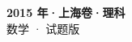 \documentclass[zihao=-4, a4paper]{ctexart}
\begin{document}
\begin{center}
  {\Large\bfseries 2015 年·上海卷·理科}\\[4pt]
  {\large 数学 · 试题版}
\end{center}
\medskip
{}

\end{document}
